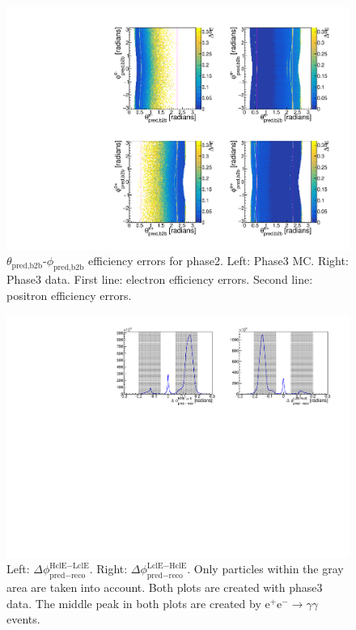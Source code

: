 \documentclass[a4paper,11pt,twosided,final,german,openbib,pdftex,listof=totoc,bibliography=totoc]{scrbook}
\begin{document}
\begin{appendix}
\begin{figure}[!htbp]
	\centering
	\includegraphics[width=\textwidth]{Plots/master3/xCEffTP_MCData_ErrorP3.pdf}
	\caption[$\theta_{\textrm{pred,b2b}}$-$\phi_{\textrm{pred,b2b}}$ Efficiency Error Plots Phase3]{$\theta_{\textrm{pred,b2b}}$-$\phi_{\textrm{pred,b2b}}$ efficiency errors for phase2. Left: Phase3 MC. Right: Phase3 data. First line: electron efficiency errors. Second line: positron efficiency errors.}
	\label{plt:xCEff_ErrorP3}
\end{figure}



\begin{figure}[h!]
	\centering
	\includegraphics[width=\textwidth]{Plots/master3/hb2b_DataP3.pdf}
	\caption[b2bClusterPhi - clusterPhi For Phase3 Data]{Left: $\Delta \phi _{\textrm{pred} - \textrm{reco}}^{\textrm{HclE}-\textrm{LclE}}$. Right:  $\Delta \phi _{\textrm{pred} - \textrm{reco}}^{\textrm{LclE}-\textrm{HclE}}$. Only particles within the gray area are taken into account. Both plots are created with phase3 data. The middle peak in both plots are created by $\textrm{e}^+\textrm{e}^- \rightarrow \gamma \gamma$ events.}
	\label{fig:b2bData3}
\end{figure}





\end{appendix}
\end{document}

